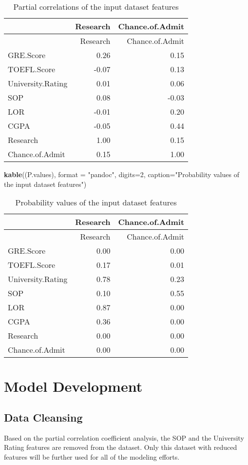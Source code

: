 \documentclass[11pt,]{article}
\newenvironment{Shaded}{\begin{snugshade}}{\end{snugshade}}
\newcommand{\DataTypeTok}[1]{\textcolor[rgb]{0.13,0.29,0.53}{#1}}
\newcommand{\DecValTok}[1]{\textcolor[rgb]{0.00,0.00,0.81}{#1}}
\newcommand{\KeywordTok}[1]{\textcolor[rgb]{0.13,0.29,0.53}{\textbf{#1}}}
\newcommand{\NormalTok}[1]{#1}
\newcommand{\StringTok}[1]{\textcolor[rgb]{0.31,0.60,0.02}{#1}}
\begin{document}
\begin{longtable}[]{@{}lrr@{}}
\caption{Partial correlations of the input dataset
features}\tabularnewline
\toprule
& Research & Chance.of.Admit\tabularnewline
\midrule
\endfirsthead
\toprule
& Research & Chance.of.Admit\tabularnewline
\midrule
\endhead
GRE.Score & 0.26 & 0.15\tabularnewline
TOEFL.Score & -0.07 & 0.13\tabularnewline
University.Rating & 0.01 & 0.06\tabularnewline
SOP & 0.08 & -0.03\tabularnewline
LOR & -0.01 & 0.20\tabularnewline
CGPA & -0.05 & 0.44\tabularnewline
Research & 1.00 & 0.15\tabularnewline
Chance.of.Admit & 0.15 & 1.00\tabularnewline
\bottomrule
\end{longtable}

\begin{Shaded}
\begin{Highlighting}[]
\KeywordTok{kable}\NormalTok{((P.values), }\DataTypeTok{format =} \StringTok{"pandoc"}\NormalTok{, }\DataTypeTok{digits=}\DecValTok{2}\NormalTok{, }
      \DataTypeTok{caption=}\StringTok{"Probability values  of the input dataset features"}\NormalTok{) }
\end{Highlighting}
\end{Shaded}

\begin{longtable}[]{@{}lrr@{}}
\caption{Probability values of the input dataset
features}\tabularnewline
\toprule
& Research & Chance.of.Admit\tabularnewline
\midrule
\endfirsthead
\toprule
& Research & Chance.of.Admit\tabularnewline
\midrule
\endhead
GRE.Score & 0.00 & 0.00\tabularnewline
TOEFL.Score & 0.17 & 0.01\tabularnewline
University.Rating & 0.78 & 0.23\tabularnewline
SOP & 0.10 & 0.55\tabularnewline
LOR & 0.87 & 0.00\tabularnewline
CGPA & 0.36 & 0.00\tabularnewline
Research & 0.00 & 0.00\tabularnewline
Chance.of.Admit & 0.00 & 0.00\tabularnewline
\bottomrule
\end{longtable}

\hypertarget{model-development}{%
\section{Model Development}\label{model-development}}

\hypertarget{data-cleansing}{%
\subsection{Data Cleansing}\label{data-cleansing}}

Based on the partial correlation coefficient analysis, the SOP and the
University Rating features are removed from the dataset. Only this
dataset with reduced features will be further used for all of the
modeling efforts.
\end{document}
